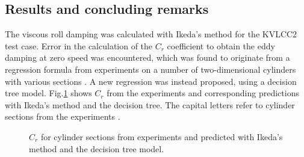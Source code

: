 \subsection*{Results and concluding remarks}
The viscous roll damping was calculated with Ikeda's method \cite{ikeda_components_1978} for the KVLCC2 test case. Error in the calculation of the $C_r$ coefficient to obtain the eddy damping at zero speed was encountered, which was found to originate from a regression formula from experiments on a number of two-dimensional cylinders with various sections \cite{ikeda_eddy_1978}. A new regression was instead proposed, using a decision tree model.
Fig.\ref{fig:ikeda_sections} shows $C_r$ from the experiments and corresponding predictions with Ikeda's method and the decision tree. The capital letters refer to cylinder sections from the experiments
\cite{ikeda_eddy_1978}.
\begin{figure}[h]
\vspace{-0.4cm}
\caption{$C_r$ for cylinder sections from experiments and predicted with Ikeda's method and the decision tree model.}
\label{fig:ikeda_sections}
\end{figure}

